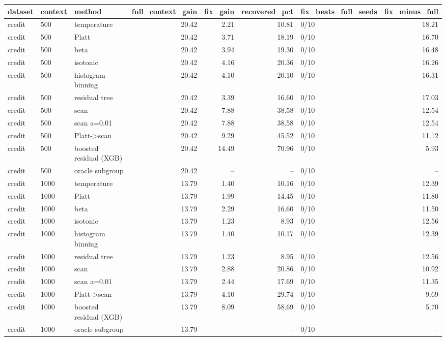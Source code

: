 \begin{tabular}{lllrrrlr}
\toprule
dataset & context & method & full_context_gain & fix_gain & recovered_pct & fix_beats_full_seeds & fix_minus_full \\
\midrule
credit & 500 & temperature & 20.42 & 2.21 & 10.81 & 0/10 & 18.21 \\
credit & 500 & Platt & 20.42 & 3.71 & 18.19 & 0/10 & 16.70 \\
credit & 500 & beta & 20.42 & 3.94 & 19.30 & 0/10 & 16.48 \\
credit & 500 & isotonic & 20.42 & 4.16 & 20.36 & 0/10 & 16.26 \\
credit & 500 & histogram binning & 20.42 & 4.10 & 20.10 & 0/10 & 16.31 \\
credit & 500 & residual tree & 20.42 & 3.39 & 16.60 & 0/10 & 17.03 \\
credit & 500 & scan & 20.42 & 7.88 & 38.58 & 0/10 & 12.54 \\
credit & 500 & scan a=0.01 & 20.42 & 7.88 & 38.58 & 0/10 & 12.54 \\
credit & 500 & Platt->scan & 20.42 & 9.29 & 45.52 & 0/10 & 11.12 \\
credit & 500 & boosted residual (XGB) & 20.42 & 14.49 & 70.96 & 0/10 & 5.93 \\
credit & 500 & oracle subgroup & 20.42 & -- & -- & 0/10 & -- \\
credit & 1000 & temperature & 13.79 & 1.40 & 10.16 & 0/10 & 12.39 \\
credit & 1000 & Platt & 13.79 & 1.99 & 14.45 & 0/10 & 11.80 \\
credit & 1000 & beta & 13.79 & 2.29 & 16.60 & 0/10 & 11.50 \\
credit & 1000 & isotonic & 13.79 & 1.23 & 8.93 & 0/10 & 12.56 \\
credit & 1000 & histogram binning & 13.79 & 1.40 & 10.17 & 0/10 & 12.39 \\
credit & 1000 & residual tree & 13.79 & 1.23 & 8.95 & 0/10 & 12.56 \\
credit & 1000 & scan & 13.79 & 2.88 & 20.86 & 0/10 & 10.92 \\
credit & 1000 & scan a=0.01 & 13.79 & 2.44 & 17.69 & 0/10 & 11.35 \\
credit & 1000 & Platt->scan & 13.79 & 4.10 & 29.74 & 0/10 & 9.69 \\
credit & 1000 & boosted residual (XGB) & 13.79 & 8.09 & 58.69 & 0/10 & 5.70 \\
credit & 1000 & oracle subgroup & 13.79 & -- & -- & 0/10 & -- \\

\end{tabular}
